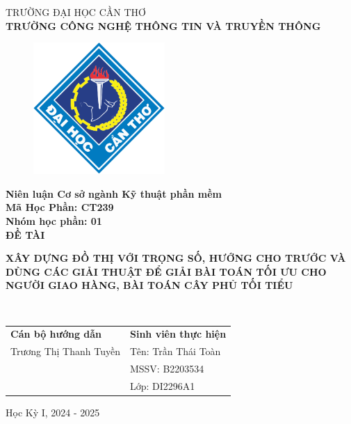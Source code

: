 \begin{titlepage}
  \begin{center}
    \vspace{-6pt}TRƯỜNG ĐẠI HỌC CẦN THƠ \\
    \textbf{\fontsize{16pt}{0pt}\selectfont TRƯỜNG CÔNG NGHỆ THÔNG TIN VÀ TRUYỀN THÔNG}
    \begin{figure}[H]
      \centering
      \includegraphics[width=5cm]{assets/imgs/logo-ctu.png}
    \end{figure}
    \textbf{Niên luận Cơ sở ngành Kỹ thuật phần mềm} \\
    \textbf{Mã Học Phần: CT239} \\
    \textbf{Nhóm học phần: 01} \\
    \vspace{3cm}
    \textbf{\fontsize{16pt}{0pt}\selectfont ĐỀ TÀI} \\
    \vspace{0.5cm}
    \parbox{15cm}{\centering\textbf{\fontsize{14pt}{0pt}\selectfont XÂY DỰNG ĐỒ THỊ VỚI TRỌNG SỐ, HƯỚNG CHO TRƯỚC VÀ DÙNG CÁC GIẢI THUẬT ĐỂ GIẢI BÀI TOÁN TỐI ƯU CHO NGƯỜI GIAO HÀNG, BÀI TOÁN CÂY PHỦ TỐI TIỂU }} \\
    \vspace{3.5cm}
    \newcommand{\MyIndent}{\hspace{1cm}}
    \begin{tabular}{p{8cm} l}
      \textbf{Cán bộ hướng dẫn}        & \textbf{Sinh viên thực hiện}  \\
      \MyIndent Trương Thị Thanh Tuyền & \MyIndent Tên: Trần Thái Toàn \\
                                       & \MyIndent MSSV: B2203534      \\
                                       & \MyIndent Lớp: DI2296A1       \\
    \end{tabular}


    \vspace{1.5cm}
    \fontsize{14pt}{0pt}\selectfont Học Kỳ I, 2024 - 2025
  \end{center}
\end{titlepage}
\cleardoublepage
